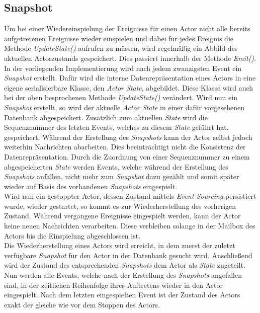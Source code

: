 \subsection{Snapshot}
\label{subsec:implementation:eventSouring:Snapshot}
Um bei einer Wiedereinspielung der Ereignisse für einen Actor nicht alle bereits aufgetretenen Ereignisse wieder einspielen und dabei für jedes Ereignis die Methode \textit{UpdateState()} aufrufen zu müssen, wird regelmäßig ein Abbild des aktuellen Actorzustands gespeichert. Dies passiert innerhalb der Methode \textit{Emit()}. In der vorliegenden Implementierung wird nach jedem zwanzigsten Event ein \textit{Snapshot} erstellt. Dafür wird die interne Datenrepräsentation eines Actors in eine eigene serialisierbare Klasse, den \textit{Actor State}, abgebildet. Diese Klasse wird auch bei der oben besprochenen Methode \textit{UpdateState()} verändert. Wird nun ein \textit{Snapshot} erstellt, so wird der aktuelle \textit{Actor State} in einer dafür vorgesehenen Datenbank abgespeichert. Zusätzlich zum aktuellen \textit{State} wird die Sequenznummer des letzten Events, welches zu diesem \textit{State} geführt hat, gespeichert. Während der Erstellung des \textit{Snapshots} kann der Actor selbst jedoch weiterhin Nachrichten abarbeiten. Dies beeinträchtigt nicht die Konsistenz der Datenrepräsentation. Durch die Zuordnung von einer Sequenznummer zu einem abgespeicherten \textit{State} werden Events, welche während der Erstellung des \textit{Snapshots} anfallen, nicht mehr zum \textit{Snapshot} dazu gezählt und somit später wieder auf Basis des vorhandenen \textit{Snapshots} eingespielt. \\
Wird nun ein gestoppter Actor, dessen Zustand mittels \textit{Event-Sourcing} persistiert wurde, wieder gestartet, so kommt es zur Wiederherstellung des vorherigen Zustand. Während vergangene Ereignisse eingespielt werden, kann der Actor keine neuen Nachrichten verarbeiten. Diese verbleiben solange in der Mailbox des Actors bis die Einspielung abgeschlossen ist. \\
Die Wiederherstellung eines Actors wird erreicht, in dem zuerst der zuletzt verfügbare \textit{Snapshot} für den Actor in der Datenbank gesucht wird. Anschließend wird der Zustand des entsprechenden \textit{Snapshots} dem Actor als \textit{State} zugeteilt. Nun werden alle Events, welche nach der Erstellung des \textit{Snapshots} angefallen sind, in der zeitlichen Reihenfolge ihres Auftretens wieder in den Actor eingespielt. Nach dem letzten eingespielten Event ist der Zustand des Actors exakt der gleiche wie vor dem Stoppen des Actors. \\

